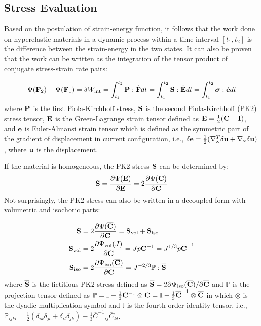 %
\subsection{Stress Evaluation} \label{general_stress}
Based on the postulation of strain-energy function, it follows that the work done on hyperelastic materials in a dynamic process within a time interval $[t_1, t_2]$ is the difference between the strain-energy in the two states. It can also be proven that the work can be written as the integration of the tensor product of conjugate stress-strain rate pairs:

\begin{equation}
\Psi(\bold{F}_2) - \Psi(\bold{F}_1) = \delta{W_\mathrm{int}} = \int_{t_1}^{t_2}\bold{P}:\dot{\bold{F}}dt = \int_{t_1}^{t_2}\bold{S}:\dot{\bold{E}}dt = 
\int_{t_1}^{t_2}\boldsymbol{\sigma}:\dot{\bold{e}}dt
\end{equation}
where $\bold{P}$ is the first Piola-Kirchhoff stress, $\bold{S}$ is the second Piola-Kirchhoff (PK2) stress tensor, $\bold{E}$ is the Green-Lagrange strain tensor defined as $\bold{E} = \frac{1}{2}(\bold{C} - \bold{I})$, and $\bold{e}$ is Euler-Almansi strain tensor which is defined as the symmetric part of the gradient of displacement in current configuration, i.e., $\delta\bold{e} = \frac{1}{2}( \nabla_{\bold{x}}^T\delta\bold{u} + \nabla_{\bold{x}}\delta\bold{u} )$, where $\bold{u}$ is the displacement.

If the material is homogeneous, the PK2 stress $\bold{S}$ can be determined by: 
\begin{equation}
\bold{S}  = \frac{\partial\Psi(\bold{E})}{\partial{\bold{E}}} = 2\frac{\partial\Psi(\bold{C})}{\partial{\bold{C}}}\end{equation}
Not surprisingly, the PK2 stress can also be written in a decoupled form with volumetric and isochoric parts:

\begin{subequations}
\label{S}
\begin{align}
\bold{S} &=  2\frac{\partial{\Psi(\overline{\bold{C}})}}{\partial{\bold{C}}} = \bold{S}_\mathrm{vol}  + \bold{S}_\mathrm{iso} 
\label {Stotal} \\
\bold{S}_\mathrm{vol} &= 2\frac{\partial{\Psi_\mathrm{vol}(J)}}{\partial{\bold{C}}} = Jp{\bold{C}} ^{-1} = J^{1/3}p{\overline{\bold{C}}}^{-1} 
\label{Svol} \\
\bold{S}_\mathrm{iso}  &= 2\frac{\partial{\Psi_\mathrm{iso}({\overline{\bold{C}})}}}{\partial{\bold{C}}} = J^{-2/3}\mathbb{P}:\overline{\bold{S}}
\label{Siso}
\end{align}
\end{subequations}
where  $\overline{\bold{S}}$ is the fictitious PK2 stress defined as
$\overline{\bold{S}} = 2{\partial\Psi_\mathrm{iso}({\overline{\bold{C}})}} / {\partial\overline{\bold{C}}}$
and $\mathbb{P}$ is the projection tensor defined as $\mathbb{P} = \mathbb{I} - \frac{1}{3}\bold{C}^{-1} \otimes \bold{C} = \mathbb{I} - \frac{1}{3}\overline{\bold{C}}^{-1} \otimes \overline{\bold{C}} $ in which $\otimes$ is the dyadic multiplication symbol and $\mathbb{I}$ is the fourth order identity tensor, i.e.,  $\mathbb{P}_{ijkl} =  \frac{1}{2}(\delta_{ik}\delta_{jl} + \delta_{il}\delta_{jk}) - \frac{1}{3} {\overline{{C}}^{-1}}_{ij} {\overline{C}}_{kl}$.


